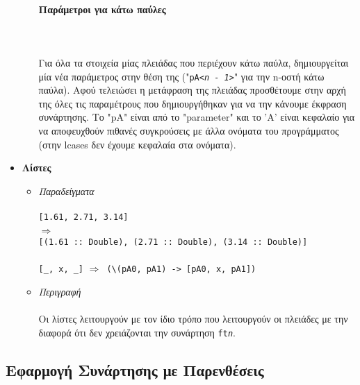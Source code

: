 \documentclass[diploma]{softlab-thesis}
\def\lra{$\Longrightarrow$\ }
\def\pend{\mbox{}\\\\}
\begin{document}
\begin{itemize}
\begin{itemize}
\paragraph{Παράμετροι για κάτω παύλες}\pend
Για όλα τα στοιχεία μίας πλειάδας που περιέχουν κάτω παύλα, δημιουργείται μία
νέα παράμετρος στην θέση της ("\texttt{pA\textit{<n - 1>}}" για την n-οστή κάτω
παύλα). Αφού τελειώσει η μετάφραση της πλειάδας προσθέτουμε στην αρχή της όλες
τις παραμέτρους που δημιουργήθηκαν για να την κάνουμε έκφραση συνάρτησης. Το
"pA" είναι από το "parameter" και το 'A' είναι κεφαλαίο για να αποφευχθούν
πιθανές συγκρούσεις με άλλα ονόματα του προγράμματος (στην lcases δεν έχουμε
κεφαλαία στα ονόματα).

\end{itemize}

\item
\textbf{Λίστες}

\begin{itemize}
\item
\textit{Παραδείγματα}\\\\
\texttt{[1.61, 2.71, 3.14]}
\\ \lra \\
\verb|[(1.61 :: Double), (2.71 :: Double), (3.14 :: Double)]| \\\\
\verb|[_, x, _]| \lra \verb|(\(pA0, pA1) -> [pA0, x, pA1])| \\

\item
\textit{Περιγραφή}\\\\
Οι λίστες λειτουργούν με τον ίδιο τρόπο που λειτουργούν οι πλειάδες με την
διαφορά ότι δεν χρειάζονται την συνάρτηση \texttt{ft\textit{n}}.

\end{itemize}

\end{itemize}

\newpage

\subsection{Εφαρμογή Συνάρτησης με Παρενθέσεις}
\end{document}
